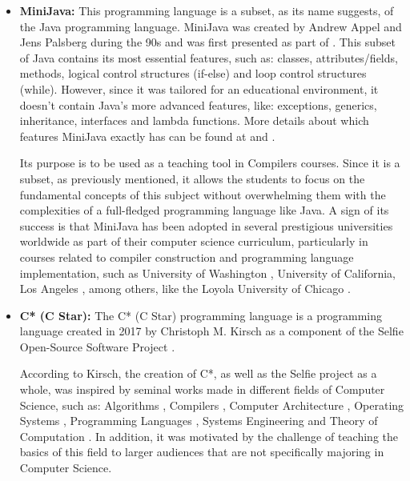 \begin{itemize}
    \item \textbf{MiniJava:} This programming language \cite{cambridge_minijava_project} is a subset, as its name suggests, of the Java programming language. MiniJava was created by Andrew Appel and Jens Palsberg during the 90s and was first presented as part of \cite{appel2002modernCompilerImplementationJava}. This subset of Java contains its most essential features, such as: classes, attributes/fields, methods, logical control structures (if-else) and loop control structures (while). However, since it was tailored for an educational environment, it doesn't contain Java's more advanced features, like: exceptions, generics, inheritance, interfaces and lambda functions. More details about which features MiniJava exactly has can be found at \cite{cambridge_minijava_project} and \cite{cambridge_minijava_grammar}.
        
    Its purpose is to be used as a teaching tool in Compilers courses. Since it is a subset, as previously mentioned, it allows the students to focus on the fundamental concepts of this subject without overwhelming them with the complexities of a full-fledged programming language like Java.
    A sign of its success is that MiniJava has been adopted in several prestigious universities worldwide as part of their computer science curriculum, particularly in courses related to compiler construction and programming language implementation, such as University of Washington \cite{university_of_washington_cs_compiler_construction_course_page_2024}, University of California, Los Angeles \cite{ucla_cs_compiler_construction_course_page_fall_2012}, among others, like the Loyola University of Chicago \cite{loyola_university_of_chicago_cs_compiler_construction_course_page_fall_2018}.     
    
    \item \textbf{C* (C Star):} The C* (C Star) programming language \cite{kirsch2017selfie} is a programming language created in 2017 by Christoph M. Kirsch as a component of the Selfie Open-Source Software Project \cite{selfie_official_website} \cite{selfie_official_repo_github}.

    According to Kirsch, the creation of C*, as well as the Selfie project as a whole, was inspired by seminal works made in different fields of Computer Science, such as: Algorithms \cite{knuth2011art} \cite{wirth1976algorithms}, Compilers \cite{wirth1996compiler}, Computer Architecture \cite{hennessy2011computer}, Operating Systems \cite{liedtke1996toward}, Programming Languages \cite{kernighan1988c} \cite{richards2009bcpl}, Systems Engineering \cite{dijkstra1968structure} \cite{goldberg1983smalltalk} \cite{nisan2005elements} \cite{sussman1996structure} and Theory of Computation \cite{sipser1996introduction}. In addition, it was motivated by the challenge of teaching the basics of this field to larger audiences that are not specifically majoring in Computer Science.


\end{itemize}
